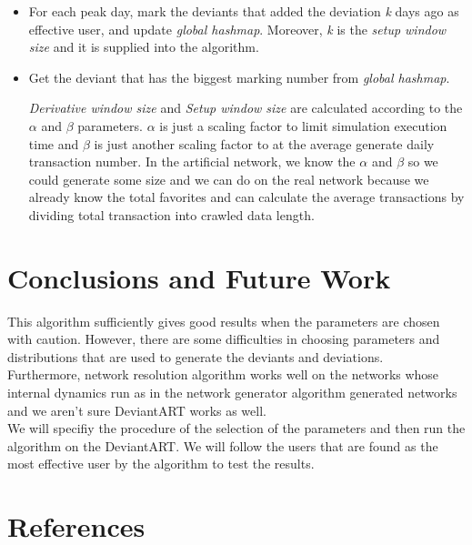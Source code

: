 \documentclass[12pt,a4paper]{report}
\begin{document}
\begin{itemize}
	\item For each peak day, mark the deviants that added the deviation \emph{k} days ago as effective user, and update \emph{global hashmap}. Moreover, \emph{k} is the \emph{setup window size} and it is supplied into the algorithm.

	\item Get the deviant that has the biggest marking number from \emph{global hashmap}.

	\emph{Derivative window size} and \emph{Setup window size} are calculated according to the $\alpha$ and $\beta$ parameters. $\alpha$ is just a scaling factor to limit simulation execution time and $\beta$ is just another scaling factor to at the average  generate daily transaction number. In the artificial network, we know the $\alpha$ and $\beta$ so we could generate some size and we can do on the real network because we already know the total favorites and can calculate the average transactions by dividing total transaction into crawled data length. 

	\end{itemize}
	

\chapter{Conclusions and Future Work}

	This algorithm sufficiently gives good results when the parameters are chosen with caution. However, there are some difficulties in choosing parameters and distributions that are used to generate the deviants and deviations. \\

	Furthermore, network resolution algorithm works well on the networks whose internal dynamics run as in the network generator algorithm generated networks and we aren't sure DeviantART works as well. \\

	We will specifiy the procedure of the selection of the parameters and then run the algorithm on the DeviantART.  We will follow the users that are found as the most effective user by the algorithm to test the results. 


\chapter{References}
\end{document}
